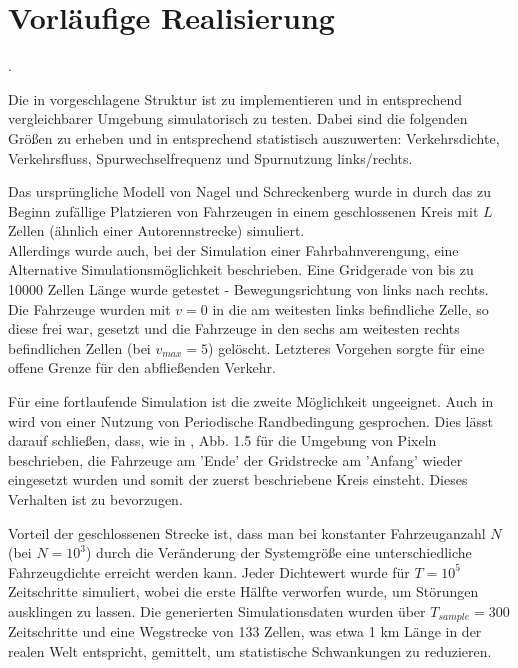 \section{Vorläufige Realisierung}
\label{sec:realisierung}

.

Die in \cite{dat-ba} vorgeschlagene Struktur ist zu implementieren und in entsprechend vergleichbarer Umgebung simulatorisch zu testen. Dabei sind die folgenden Größen zu erheben und in entsprechend statistisch auszuwerten: Verkehrsdichte, Verkehrsfluss, Spurwechselfrequenz und Spurnutzung links/rechts.

Das ursprüngliche Modell von Nagel und Schreckenberg wurde in \cite{na-sch} durch das zu Beginn zufällige Platzieren von Fahrzeugen in einem geschlossenen Kreis mit $L$ Zellen (ähnlich einer Autorennstrecke) simuliert. \\
Allerdings wurde auch, bei der Simulation einer Fahrbahnverengung, eine Alternative Simulationsmöglichkeit beschrieben. 
Eine Gridgerade von bis zu 10000 Zellen Länge wurde getestet - Bewegungsrichtung von links nach rechts. 
Die Fahrzeuge wurden mit $v=0$ in die am weitesten links befindliche Zelle, so diese frei war, gesetzt und die Fahrzeuge in den sechs am weitesten rechts befindlichen Zellen (bei $v_{max}=5$) gelöscht. 
Letzteres Vorgehen sorgte für eine offene Grenze für den abfließenden Verkehr.

Für eine fortlaufende Simulation ist die zweite Möglichkeit ungeeignet. Auch in \cite{multi-lane} wird von einer Nutzung von Periodische Randbedingung gesprochen. 
Dies lässt darauf schließen, dass, wie in \cite{peri-rand}, Abb. 1.5 für die Umgebung von Pixeln beschrieben, die Fahrzeuge am 'Ende' der Gridstrecke am 'Anfang' wieder eingesetzt wurden und somit der zuerst beschriebene Kreis einsteht.
Dieses Verhalten ist zu bevorzugen.

Vorteil der geschlossenen Strecke ist, dass man bei konstanter Fahrzeuganzahl $N$ (bei \cite{multi-lane} $N = 10^{3}$) durch die Veränderung der Systemgröße eine unterschiedliche Fahrzeugdichte erreicht werden kann. 
Jeder Dichtewert wurde für $T = 10^{5}$ Zeitschritte simuliert, wobei die erste Hälfte verworfen wurde, um Störungen ausklingen zu lassen. 
Die generierten Simulationsdaten wurden über $T_{sample} = 300$ Zeitschritte und eine Wegstrecke von 133 Zellen, was etwa 1 km Länge in der realen Welt entspricht, gemittelt, um statistische Schwankungen zu reduzieren.


